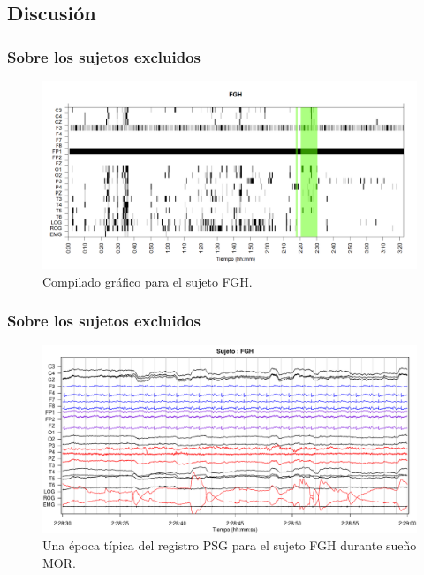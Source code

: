\documentclass{beamer}
\begin{document}
\subsection{Discusi\'on}

\begin{frame}\frametitle{Sobre los sujetos excluidos}
\begin{figure}
\centering
\includegraphics[width=0.95\linewidth]
{./muypreeliminar170408/FGHSUE_est.png} 
\caption{Compilado gr\'afico para el sujeto FGH.}
\end{figure}
\end{frame}


\begin{frame}\frametitle{Sobre los sujetos excluidos}
\begin{figure}
\centering
\includegraphics[width=0.95\linewidth]
{./p_170511/FGH_297_PDG_lucirse_PSG.pdf} 
\caption{Una \'epoca t\'ipica del registro PSG para el sujeto FGH durante sue\~no MOR. }
\end{figure}
\end{frame}

\end{document}
